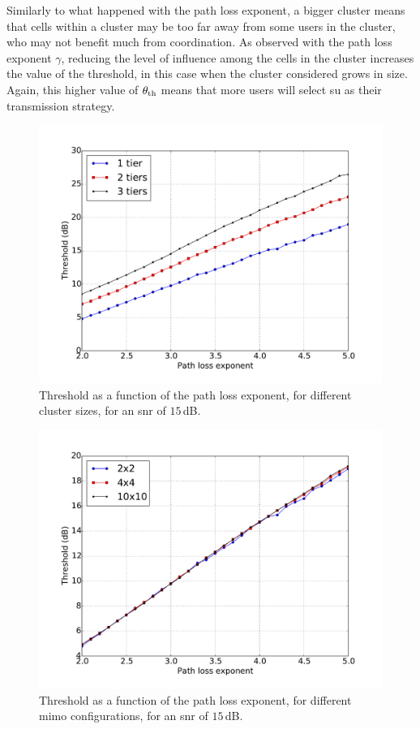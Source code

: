 Similarly to what happened with the path loss exponent, a bigger cluster means
that cells within a cluster may be too far away from some users in the cluster,
who may not benefit much from coordination. As observed with the path loss
exponent $\gamma$, reducing the level of influence among the cells in the
cluster increases the value of the threshold, in this case when the cluster
considered grows in size. Again, this higher value of $\theta_{\text{th}}$ means that more
users will select \gls{su} as their transmission strategy.

\begin{figure}[t]
	\centering
	\includegraphics[width=0.75\columnwidth]{./21.appendices/figure/threshold_exp_tiers_02x02_s+0015_r1300}
	\caption{Threshold as a function of the path loss exponent, for different
    cluster sizes, for an \gls{snr} of $15$\,dB.}
	\label{fig:th_exp_tiers}
\end{figure}

\begin{figure}[t]
	\centering
	\includegraphics[width=0.75\columnwidth]{./21.appendices/figure/threshold_exp_anten_02x02_t02_i01_r1300}
	\caption{Threshold as a function of the path loss exponent, for different
    \gls{mimo} configurations, for an \gls{snr} of $15$\,dB.}
	\label{fig:th_exp_ant}
\end{figure}

